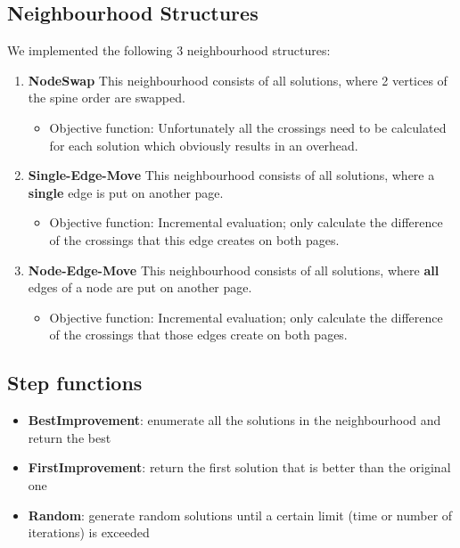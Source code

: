 \documentclass[11pt]{article}
\begin{document}
\subsection{Neighbourhood Structures}
We implemented the following 3 neighbourhood structures:
\begin{enumerate}
	\item \textbf{NodeSwap} This neighbourhood consists of all solutions, where 2 vertices of the spine order are swapped.
	\begin{itemize}
		\item Objective function: Unfortunately all the crossings need to be calculated for each solution which obviously results in an overhead.
	\end{itemize}
	\item \textbf{Single-Edge-Move} This neighbourhood consists of all solutions, where a \textbf{single} edge is put on another page.
	\begin{itemize}
		\item Objective function: Incremental evaluation; only calculate the difference of the crossings that this edge creates on both pages.
	\end{itemize}
	\item \textbf{Node-Edge-Move} This neighbourhood consists of all solutions, where \textbf{all} edges of a node are put on another page.
	\begin{itemize}
		\item Objective function: Incremental evaluation; only calculate the difference of the crossings that those edges create on both pages.
	\end{itemize}
	
\end{enumerate}


\subsection{Step functions}
\begin{itemize}
	\item \textbf{BestImprovement}: enumerate all the solutions in the neighbourhood and return the best
	\item \textbf{FirstImprovement}: return the first solution that is better than the original one
	\item \textbf{Random}: generate random solutions until a certain limit (time or number of iterations) is exceeded
\end{itemize}
\end{document}
